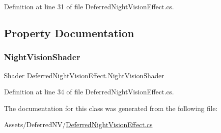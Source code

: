 Definition at line 31 of file Deferred\+Night\+Vision\+Effect.\+cs.



\subsection{Property Documentation}
\mbox{\label{class_deferred_night_vision_effect_af76ac232ab142cdc4552a8259fb57120}} 
\subsubsection{\texorpdfstring{Night\+Vision\+Shader}{NightVisionShader}}
{\footnotesize\ttfamily Shader Deferred\+Night\+Vision\+Effect.\+Night\+Vision\+Shader\hspace{0.3cm}{\ttfamily [get]}}



Definition at line 34 of file Deferred\+Night\+Vision\+Effect.\+cs.



The documentation for this class was generated from the following file\+:\begin{DoxyCompactItemize}
\item 
Assets/\+Deferred\+N\+V/\mbox{\hyperlink{_deferred_night_vision_effect_8cs}{Deferred\+Night\+Vision\+Effect.\+cs}}\end{DoxyCompactItemize}
